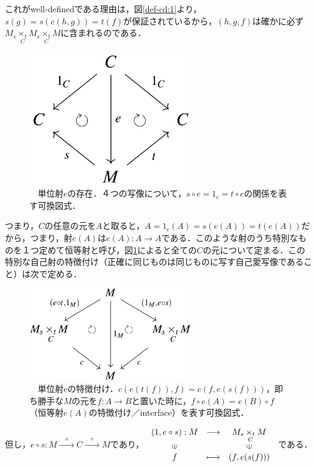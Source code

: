 \documentclass[uplatex, 12pt, a4paper, dvipdfmx]{jsarticle}
\begin{document}
これがwell-definedである理由は，図\ref{def-cd:1}より，$s(g)=s(c(h,g))=t(f)$が保証されているから，$(h,g,f)$は確かに必ず$M_s \underset{C}{\times_t}M_s \underset{C}{\times_t}M$に含まれるのである．\\[3cm]

\begin{figure}[ht] \begin{center}  \caption{\label{def-cd:3}　単位射$e$の存在．４つの写像について，$s\circ e=1_c=t\circ e$の関係を表す可換図式．}
    \includegraphics[width=7cm]{cd-3.png}
\end{center}\end{figure}
つまり，$C$の任意の元を$A$と取ると，$A=1_c(A)=s(e(A))=t(e(A))$だから，つまり，射$e(A)$は$e(A):A\longrightarrow A$である．このような射のうち特別なものを１つ定めて恒等射と呼び，図\ref{def-cd:3}によると全ての$C$の元について定まる．この特別な自己射の特徴付け（正確に同じものは同じものに写す自己愛写像であること）は次で定める．

\begin{figure}[ht] \begin{center}  \caption{\label{def-cd:4}　単位射$e$の特徴付け．$c(e(t(f)),f)=c(f,e(s(f)))$，即ち勝手な$M$の元を$f:A\longrightarrow B$と置いた時に，$f\circ e(A)=e(B)\circ f$（恒等射$e(A)$の特徴付け／interface）を表す可換図式．}
    \includegraphics[width=7cm]{cd-4.png}
\end{center}\end{figure}
但し，$e\circ s:M\xrightarrow{\quad s\quad}C\xrightarrow{\quad e \quad}M$であり，
$\begin{array}{ccc}
    (1,e\circ s):M & \longrightarrow & M_s \underset{C}{\times_t}M\\
    \rotatebox{90}{$\in$} & & \rotatebox{90}{$\in$}\\
    f & \longmapsto & (f,e(s(f)))
\end{array}$
である．
\end{document}

